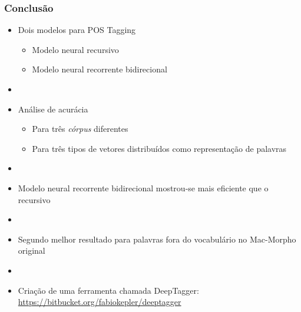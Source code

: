 \documentclass[10pt]{beamer}
\begin{document}
\begin{frame}[fragile]
  \frametitle{Conclusão}

  \begin{itemize}
    \item Dois modelos para POS Tagging
    \begin{itemize}
      \item Modelo neural recursivo
      \item Modelo neural recorrente bidirecional
    \end{itemize}

    \item[\ ] \ 

    \item Análise de acurácia
    \begin{itemize}
      \item Para três \textit{córpus} diferentes
      \item Para três tipos de vetores distribuídos como representação de palavras
    \end{itemize}

    \item[\ ] \ 

    \item Modelo neural recorrente bidirecional mostrou-se mais eficiente que o recursivo

    \item[\ ] \ 

    \item Segundo melhor resultado para palavras fora do vocabulário no Mac-Morpho original

    \item[\ ] \ 

    \item Criação de uma ferramenta chamada DeepTagger: \url{https://bitbucket.org/fabiokepler/deeptagger}
  \end{itemize}

\end{frame}
\end{document}
